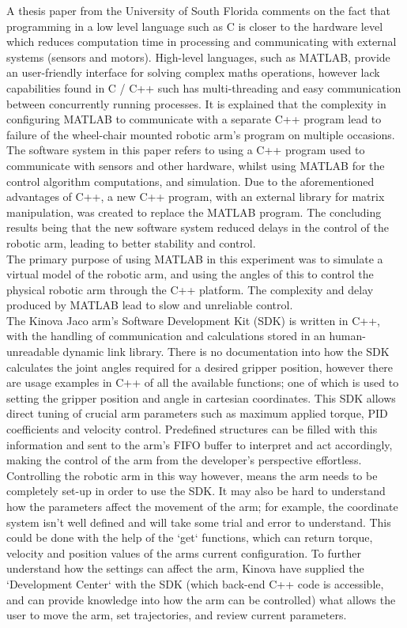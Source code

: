 \documentclass[12pt,openany,a4paper]{book}
\begin{document}
A thesis paper from the University of South Florida comments on the fact that programming in a low level language such as C is closer to the hardware level which reduces computation time in processing and communicating with external systems (sensors and motors)\cite{software-IK9DOF}. High-level languages, such as MATLAB, provide an user-friendly interface for solving complex maths operations, however lack capabilities found in C / C++ such has multi-threading and easy communication between concurrently running processes. It is explained that the complexity in configuring MATLAB to communicate with a separate C++ program lead to failure of the wheel-chair mounted robotic arm's program on multiple occasions. The software system in this paper refers to using a C++ program used to communicate with sensors and other hardware, whilst using MATLAB for the control algorithm computations, and simulation. Due to the aforementioned advantages of C++, a new C++ program, with an external library for matrix manipulation, was created to replace the MATLAB program. The concluding results being that the new software system reduced delays in the control of the robotic arm, leading to better stability and control.\\
The primary purpose of using MATLAB in this experiment was to simulate a virtual model of the robotic arm, and using the angles of this to control the physical robotic arm through the C++ platform. The complexity and delay produced by MATLAB lead to slow and unreliable control.\\


The Kinova Jaco arm's Software Development Kit (SDK) is written in C++, with the handling of communication and calculations stored in an human-unreadable dynamic link library. There is no documentation into how the SDK calculates the joint angles required for a desired gripper position, however there are usage examples in C++ of all the available functions; one of which is used to setting the gripper position and angle in cartesian coordinates. This SDK allows direct tuning of crucial arm parameters such as maximum applied torque, PID coefficients and velocity control. Predefined structures can be filled with this information and sent to the arm's FIFO buffer to interpret and act accordingly, making the control of the arm from the developer's perspective effortless.\\
Controlling the robotic arm in this way however, means the arm needs to be completely set-up in order to use the SDK. It may also be hard to understand how the parameters affect the movement of the arm; for example, the coordinate system isn't well defined and will take some trial and error to understand. This could be done with the help of the `get` functions, which can return torque, velocity and position values of the arms current configuration. To further understand how the settings can affect the arm, Kinova have supplied the `Development Center` with the SDK (which back-end C++ code is accessible, and can provide knowledge into how the arm can be controlled) what allows the user to move the arm, set trajectories, and review current parameters.\\
\end{document}
